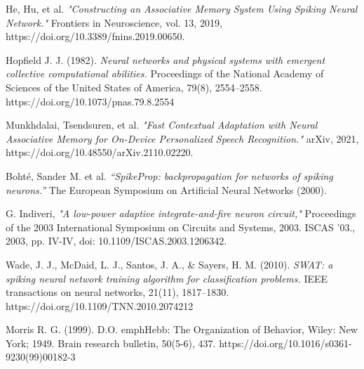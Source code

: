 \begin{thebibliography}{99}

	He, Hu, et al. \emph{"Constructing an Associative Memory System Using Spiking Neural Network."} Frontiers in Neuroscience, vol. 13, 2019, https://doi.org/10.3389/fnins.2019.00650.

	Hopfield J. J. (1982). \emph{Neural networks and physical systems with emergent collective computational abilities.} Proceedings of the National Academy of Sciences of the United States of America, 79(8), 2554–2558. https://doi.org/10.1073/pnas.79.8.2554

	Munkhdalai, Tsendsuren, et al. \emph{"Fast Contextual Adaptation with Neural Associative Memory for On-Device Personalized Speech Recognition."} arXiv, 2021, https://doi.org/10.48550/arXiv.2110.02220.

	Bohté, Sander M. et al. \emph{“SpikeProp: backpropagation for networks of spiking neurons.”} The European Symposium on Artificial Neural Networks (2000).

	G. Indiveri, \emph{"A low-power adaptive integrate-and-fire neuron circuit,"} Proceedings of the 2003 International Symposium on Circuits and Systems, 2003. ISCAS '03., 2003, pp. IV-IV, doi: 10.1109/ISCAS.2003.1206342.

	Wade, J. J., McDaid, L. J., Santos, J. A., \& Sayers, H. M. (2010). \emph{SWAT: a spiking neural network training algorithm for classification problems.} IEEE transactions on neural networks, 21(11), 1817–1830. https://doi.org/10.1109/TNN.2010.2074212

	Morris R. G. (1999). D.O. emph{Hebb: The Organization of Behavior,} Wiley: New York; 1949. Brain research bulletin, 50(5-6), 437. https://doi.org/10.1016/s0361-9230(99)00182-3

\end{thebibliography}